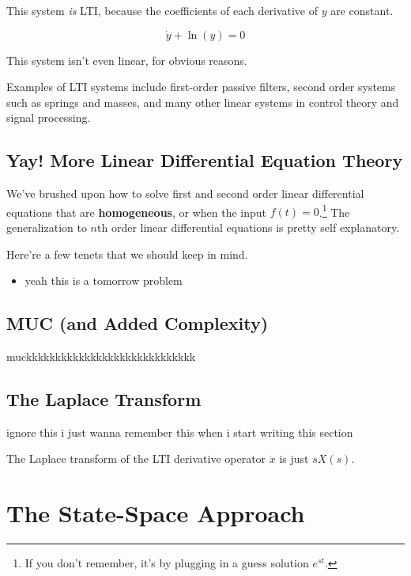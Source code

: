 \documentclass{report}
\begin{document}
\begin{onehalfspacing}
\begin{flushleft}
This system \textit{is} LTI, because the coefficients of each derivative of \(y\) are constant.

\vspace{-0.1in}
\[\dot{y} + \ln(y) = 0\]

This system isn't even linear, for obvious reasons.

\medskip

Examples of LTI systems include first-order passive filters, second order systems such as springs and masses, and many other linear systems in control theory and signal processing.

\medskip



\section{Yay! More Linear Differential Equation Theory}

We've brushed upon how to solve first and second order linear differential equations that are \textbf{homogeneous}, or when the input \(f(t) = 0\).\footnote{If you don't remember, it's by plugging in a guess solution \(e^{st}\).} The generalization to \(n\)th order linear differential equations is pretty self explanatory.

\medskip

Here're a few tenets that we should keep in mind.

\begin{itemize}[noitemsep,topsep=0.5pt]
    \item yeah this is a tomorrow problem
\end{itemize}

\section{MUC (and Added Complexity)}

muckkkkkkkkkkkkkkkkkkkkkkkkkkkkk

\section{The Laplace Transform}

ignore this i just wanna remember this when i start writing this section

The Laplace transform of the LTI derivative operator \(\dot{x}\) is just \(sX(s)\).

\chapter{The State-Space Approach}


\end{flushleft}
\end{onehalfspacing}
\end{document}
